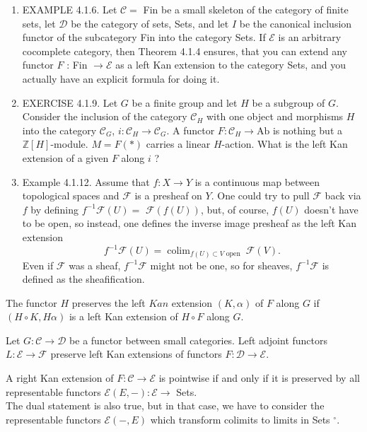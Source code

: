 \begin{example}
    \begin{enumerate}
        \item EXAMPLE 4.1.6. Let $\mathcal{C}=$ Fin be a small skeleton of the category of finite sets, let $\mathcal{D}$ be the category of sets, Sets, and let $I$ be the canonical inclusion functor of the subcategory Fin into the category Sets. If $\mathcal{E}$ is an arbitrary cocomplete category, then Theorem 4.1.4 ensures, that you can extend any functor $F$ : Fin $\rightarrow \mathcal{E}$ as a left Kan extension to the category Sets, and you actually have an explicit formula for doing it.
        \item EXERCISE 4.1.9. Let $G$ be a finite group and let $H$ be a subgroup of $G$. Consider the inclusion of the category $\mathcal{C}_H$ with one object and morphisms $H$ into the category $\mathcal{C}_G$, $i: \mathcal{C}_H \rightarrow \mathcal{C}_G$. A functor $F: \mathcal{C}_H \rightarrow \mathrm{Ab}$ is nothing but a $\mathbb{Z}[H]$-module. $M=F(*)$ carries a linear $H$-action. What is the left Kan extension of a given $F$ along $i$ ?
        \item Example 4.1.12. Assume that $f: X \rightarrow Y$ is a continuous map between topological spaces and $\mathcal{F}$ is a presheaf on $Y$. One could try to pull $\mathcal{F}$ back via $f$ by defining $f^{-1} \mathcal{F}(U)=$ $\mathcal{F}(f(U))$, but, of course, $f(U)$ doesn't have to be open, so instead, one defines the inverse image presheaf as the left Kan extension
        $$
        f^{-1} \mathcal{F}(U)=\operatorname{colim}_{f(U) \subset V \text { open }} \mathcal{F}(V) .
        $$
        Even if $\mathcal{F}$ was a sheaf, $f^{-1} \mathcal{F}$ might not be one, so for sheaves, $f^{-1} \mathcal{F}$ is defined as the sheafification.
    \end{enumerate}
\end{example}


The functor $H$ preserves the left $K a n$ extension $(K, \alpha)$ of $F$ along $G$ if $(H \circ K, H \alpha)$ is a left Kan extension of $H \circ F$ along $G$.

\begin{theo}
Let $G: \mathcal{C} \rightarrow \mathcal{D}$ be a functor between small categories. Left adjoint functors $L: \mathcal{E} \rightarrow \mathcal{F}$ preserve left Kan extensions of functors $F: \mathcal{D} \rightarrow \mathcal{E}$.
\end{theo}

A right Kan extension of $F: \mathcal{C} \rightarrow \mathcal{E}$ is pointwise if and only if it is preserved by all representable functors $\mathcal{E}(E,-): \mathcal{E} \rightarrow$ Sets.\\
The dual statement is also true, but in that case, we have to consider the representable functors $\mathcal{E}(-, E)$ which transform colimits to limits in Sets ${ }^{\circ}$.

